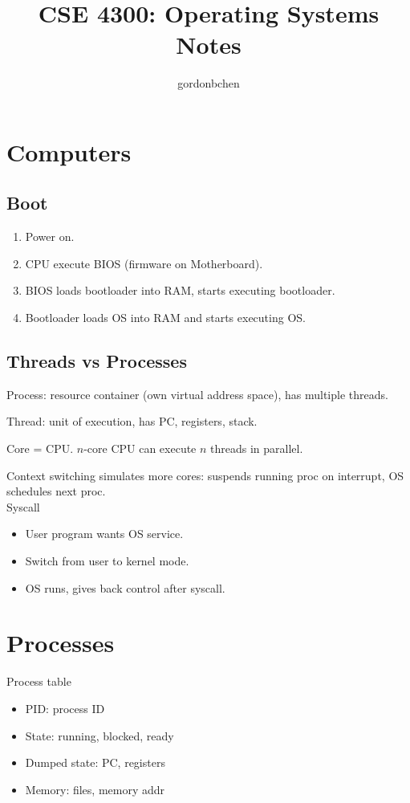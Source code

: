 \documentclass[10pt]{article}
\title{CSE 4300: Operating Systems Notes}
\author{gordonbchen}
\date{}
\begin{document}
\maketitle


\section{Computers}

\subsection{Boot}
\begin{enumerate}
    \item Power on.
    \item CPU execute BIOS (firmware on Motherboard).
    \item BIOS loads bootloader into RAM, starts executing bootloader.
    \item Bootloader loads OS into RAM and starts executing OS.
\end{enumerate}

\subsection{Threads vs Processes}
Process: resource container (own virtual address space), has multiple threads.

Thread: unit of execution, has PC, registers, stack.

Core = CPU. $n$-core CPU can execute $n$ threads in parallel.

Context switching simulates more cores: suspends running proc on interrupt, OS schedules next proc.\\

Syscall
\begin{itemize}
    \item User program wants OS service.
    \item Switch from user to kernel mode.
    \item OS runs, gives back control after syscall.
\end{itemize}


\section{Processes}
Process table
\begin{itemize}
    \item PID: process ID
    \item State: running, blocked, ready
    \item Dumped state: PC, registers
    \item Memory: files, memory addr
\end{itemize}
\end{document}
